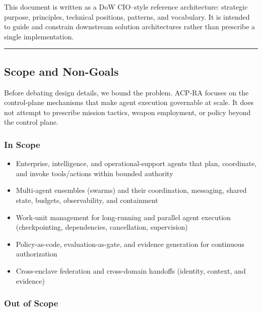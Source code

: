 \documentclass[11pt]{article}
\begin{document}
This document is written as a DoW CIO--style reference architecture:
strategic purpose, principles, technical positions, patterns, and
vocabulary. It is intended to guide and constrain downstream solution
architectures rather than prescribe a single implementation.

\vspace{2pt}\begin{center}\rule{0.62\linewidth}{0.6pt}\end{center}\vspace{2pt}

\hypertarget{scope-and-non-goals}{%
\subsection{Scope and Non-Goals}\label{scope-and-non-goals}}

Before debating design details, we bound the problem. ACP‑RA focuses on
the control-plane mechanisms that make agent execution governable at
scale. It does not attempt to prescribe mission tactics, weapon
employment, or policy beyond the control plane.

\hypertarget{in-scope}{%
\subsubsection{In Scope}\label{in-scope}}

\begin{itemize}
\tightlist
\item
  Enterprise, intelligence, and operational-support agents that plan,
  coordinate, and invoke tools/actions within bounded authority
\item
  Multi-agent ensembles (swarms) and their coordination, messaging,
  shared state, budgets, observability, and containment
\item
  Work-unit management for long-running and parallel agent execution
  (checkpointing, dependencies, cancellation, supervision)
\item
  Policy-as-code, evaluation-as-gate, and evidence generation for
  continuous authorization
\item
  Cross-enclave federation and cross-domain handoffs (identity, context,
  and evidence)
\end{itemize}

\hypertarget{out-of-scope}{%
\subsubsection{Out of Scope}\label{out-of-scope}}
\end{document}
